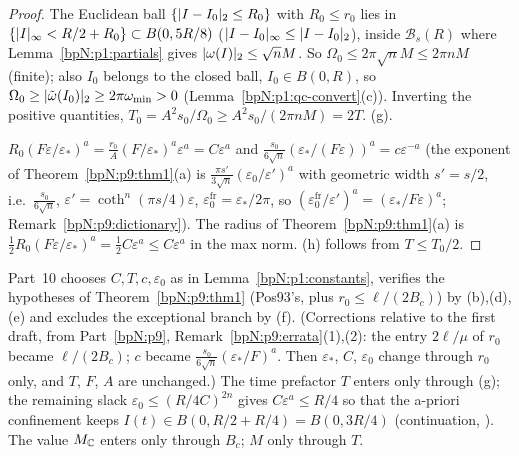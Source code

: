 \begin{proof}
\label{stepN:p1:co-time} The Euclidean ball $\{\lvert I-I_0\rvert_2\le R_0\}$ with $R_0\le r_0$ lies in $\{\lvert I\rvert_\infty<R/2+R_0\}\subset B(0,5R/8)$ ($\lvert I-I_0\rvert_\infty\le\lvert I-I_0\rvert_2$), inside $\mathcal B_s(R)$ where Lemma~\ref{bpN:p1:partials} gives $\lvert \omega(I)\rvert_2\le\sqrt nM$. So $\Omega_0\le2\pi\sqrt nM\le2\pi nM$ (finite); also $I_0$ belongs to the closed ball, $I_0\in B(0,R)$, so $\Omega_0\ge\lvert \tilde\omega(I_0)\rvert_2\ge2\pi\omega_{\min}>0$ (Lemma~\ref{bpN:p1:qc-convert}(c)). Inverting the positive quantities, $T_0=A^2s_0/\Omega_0\ge A^2s_0/(2\pi nM)=2T$. (g).

\label{stepN:p1:co-conc} $R_0(F\varepsilon/\varepsilon_*)^a=\frac{r_0}A(F/\varepsilon_*)^a\varepsilon^a=C\varepsilon^a$ and $\frac{s_0}{6\sqrt n}(\varepsilon_*/(F\varepsilon))^a=c\varepsilon^{-a}$ (the exponent of Theorem~\ref{bpN:p9:thm1}(a) is $\frac{\pi s'}{3\sqrt n}(\varepsilon_0/\varepsilon')^a$ with geometric width $s'=s/2$, i.e.\ $\frac{s_0}{6\sqrt n}$, $\varepsilon'=\coth^n(\pi s/4)\varepsilon$, $\varepsilon_0^{\mathrm{fr}}=\varepsilon_*/2\pi$, so $(\varepsilon_0^{\mathrm{fr}}/\varepsilon')^a=(\varepsilon_*/F\varepsilon)^a$; Remark~\ref{bpN:p9:dictionary}). The radius of Theorem~\ref{bpN:p9:thm1}(a) is $\frac12R_0(F\varepsilon/\varepsilon_*)^a=\frac12C\varepsilon^a\le C\varepsilon^a$ in the max norm. (h) follows from $T\le T_0/2$.
\end{proof}

\begin{remark}\label{bpN:p1:constants-use}
Part~10 chooses $C,T,c,\varepsilon_0$ as in Lemma~\ref{bpN:p1:constants}, verifies the hypotheses of Theorem~\ref{bpN:p9:thm1} (Pos93's, plus $r_0\le\ell/(2B_c)$) by (b),(d),(e) and excludes the exceptional branch by (f). (Corrections relative to the first draft, from Part~\ref{bpN:p9}, Remark~\ref{bpN:p9:errata}(1),(2): the entry $2\ell/\mu$ of $r_0$ became $\ell/(2B_c)$; $c$ became $\frac{s_0}{6\sqrt n}(\varepsilon_*/F)^a$. Then $\varepsilon_*$, $C$, $\varepsilon_0$ change through $r_0$ only, and $T$, $F$, $A$ are unchanged.) The time prefactor $T$ enters only through (g); the remaining slack
$\varepsilon_0\le(R/4C)^{2n}$ gives $C\varepsilon^a\le R/4$ so that the a-priori confinement keeps $I(t)\in B(0,R/2+R/4)=B(0,3R/4)$ (continuation, ). The value $M_{\mathbb{C}}$ enters only through $B_c$; $M$ only through $T$.
\end{remark}
\endgroup
